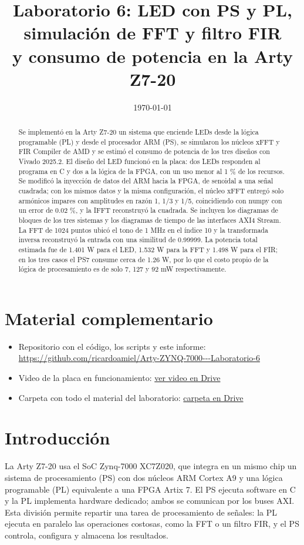 \documentclass[11pt,a4paper]{article}
\title{\textbf{Laboratorio 6: LED con PS y PL, simulación de FFT y filtro FIR\\y consumo de potencia en la Arty Z7-20}}
\author{\autores}
\date{\today}
\begin{document}
\maketitle

\begin{abstract}
Se implementó en la Arty Z7-20 un sistema que enciende LEDs desde la lógica programable (PL) y desde el procesador ARM (PS), se simularon los núcleos xFFT y FIR Compiler de AMD y se estimó el consumo de potencia de los tres diseños con Vivado 2025.2. El diseño del LED funcionó en la placa: dos LEDs responden al programa en C y dos a la lógica de la FPGA, con un uso menor al 1 \% de los recursos. Se modificó la inyección de datos del ARM hacia la FPGA, de senoidal a una señal cuadrada; con los mismos datos y la misma configuración, el núcleo xFFT entregó solo armónicos impares con amplitudes en razón 1, 1/3 y 1/5, coincidiendo con numpy con un error de 0.02 \%, y la IFFT reconstruyó la cuadrada. Se incluyen los diagramas de bloques de los tres sistemas y los diagramas de tiempo de las interfaces AXI4 Stream. La FFT de 1024 puntos ubicó el tono de 1 MHz en el índice 10 y la transformada inversa reconstruyó la entrada con una similitud de 0.99999. La potencia total estimada fue de 1.401 W para el LED, 1.532 W para la FFT y 1.498 W para el FIR; en los tres casos el PS7 consume cerca de 1.26 W, por lo que el costo propio de la lógica de procesamiento es de solo 7, 127 y 92 mW respectivamente.
\end{abstract}

\section*{Material complementario}
\begin{itemize}
  \item Repositorio con el código, los scripts y este informe: \url{https://github.com/ricardoamiel/Arty-ZYNQ-7000---Laboratorio-6}
  \item Video de la placa en funcionamiento: \href{https://drive.google.com/file/d/15j47dAb3DASq5ieea0aM342emI3dTVuM/view?usp=sharing}{ver video en Drive}
  \item Carpeta con todo el material del laboratorio: \href{https://drive.google.com/drive/folders/1psmLtL21YHwi7eiOAoLBj23YtwVGnrsq?usp=sharing}{carpeta en Drive}
\end{itemize}

\section{Introducción}
La Arty Z7-20 usa el SoC Zynq-7000 XC7Z020, que integra en un mismo chip un sistema de procesamiento (PS) con dos núcleos ARM Cortex A9 y una lógica programable (PL) equivalente a una FPGA Artix 7. El PS ejecuta software en C y la PL implementa hardware dedicado; ambos se comunican por los buses AXI. Esta división permite repartir una tarea de procesamiento de señales: la PL ejecuta en paralelo las operaciones costosas, como la FFT o un filtro FIR, y el PS controla, configura y almacena los resultados.
\end{document}
